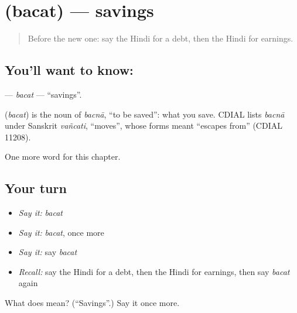 \section[\texorpdfstring{\hi{बचत} (bacat)}{बचत (bacat)}]{ (bacat) — savings}

\label{lesson:HI-C207-bacat}



\begin{quote}
Before the new one: say the Hindi for a debt, then the Hindi for earnings.
\end{quote}

\subsection*{You'll want to know: }
\textbf{} — \emph{bacat} — \textquotedblleft{}savings\textquotedblright{}.

\begin{cousinweb}
\textbf{} (\emph{bacat}) is the noun of \emph{bacnā}, \textquotedblleft{}to be saved\textquotedblright{}: what you save. CDIAL lists \emph{bacnā} under Sanskrit \emph{vañcati}, \textquotedblleft{}moves\textquotedblright{}, whose forms meant \textquotedblleft{}escapes from\textquotedblright{} (CDIAL 11208).
\end{cousinweb}

\begin{grammarlens}[title={What you've built}]
One more word for this chapter.
\end{grammarlens}

\subsection*{Your turn}
\begin{itemize}
\raggedright
  \item \emph{Say it:} \emph{bacat}
  \item \emph{Say it:} \emph{bacat}, once more
  \item \emph{Say it:} say \emph{bacat}
  \item \emph{Recall:} say the Hindi for a debt, then the Hindi for earnings, then say \emph{bacat} again
\end{itemize}

\begin{tcolorbox}[breakable,colback=teal!4,colframe=teal!35!black,title={Before you move on}]
What does  mean? (\textquotedblleft{}Savings\textquotedblright{}.) Say it once more.
\end{tcolorbox}
